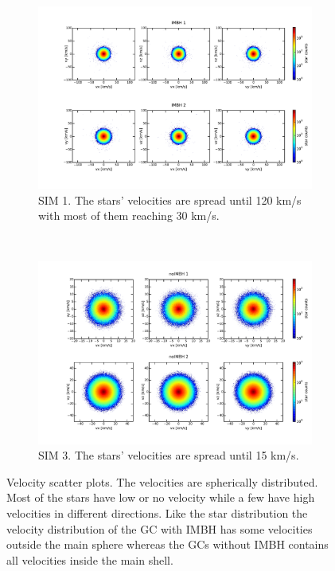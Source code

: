 \begin{figure}[htbp] 
\centering
\begin{subfigure}{0.95\textwidth}
	\centering
  	\includegraphics[width=\textwidth]{Plots/velocity_scatter_IMBH.pdf}
  	\caption{SIM 1. The stars' velocities are spread until 120 km/s with most of them reaching 30 km/s.}
 	\label{fig:vel_scat_IMBH}
\end{subfigure}
\\
\begin{subfigure}{0.95\textwidth}
	\centering
  	\includegraphics[width=\textwidth]{Plots/velocity_scatter_noIMBH.pdf}
  	\caption{SIM 3. The stars' velocities are spread until 15 km/s.}
 	\label{fig:vel_scat_noIMBH}
\end{subfigure}

\caption{Velocity scatter plots. The velocities are spherically distributed. Most of the stars have low or no velocity while a few have high velocities in different directions. Like the star distribution the velocity distribution of the \ac{GC} with \ac{IMBH} has some velocities outside the main sphere whereas the \acp{GC} without \ac{IMBH} contains all velocities inside the main shell.}
\label{fig:velocity_scatter}
\end{figure}
